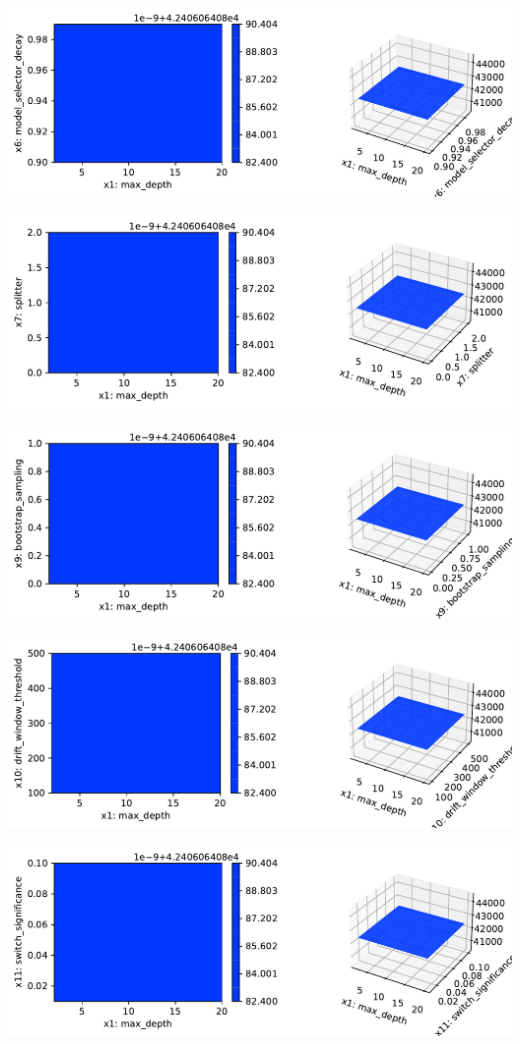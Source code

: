 \documentclass[
  letterpaper,
  DIV=11,
  numbers=noendperiod]{scrreprt}
\begin{document}
\includegraphics{024_spot_hpt_river_friedman_hatr_files/figure-pdf/cell-42-output-20.pdf}

\includegraphics{024_spot_hpt_river_friedman_hatr_files/figure-pdf/cell-42-output-21.pdf}

\includegraphics{024_spot_hpt_river_friedman_hatr_files/figure-pdf/cell-42-output-22.pdf}

\includegraphics{024_spot_hpt_river_friedman_hatr_files/figure-pdf/cell-42-output-23.pdf}

\includegraphics{024_spot_hpt_river_friedman_hatr_files/figure-pdf/cell-42-output-24.pdf}
\end{document}
